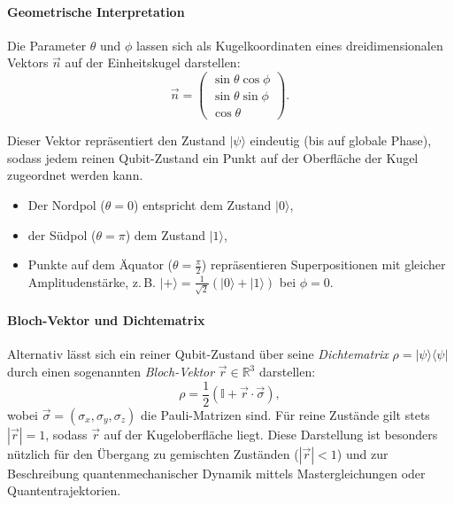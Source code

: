 \vspace{0.5em}
\paragraph{Geometrische Interpretation}

Die Parameter $\theta$ und $\phi$ lassen sich als Kugelkoordinaten eines dreidimensionalen Vektors $\vec{n}$ auf der Einheitskugel darstellen:
\begin{equation}
\vec{n} = 
\begin{pmatrix}
\sin\theta \cos\phi \\
\sin\theta \sin\phi \\
\cos\theta
\end{pmatrix}.
\end{equation}

Dieser Vektor repräsentiert den Zustand $|\psi\rangle$ eindeutig (bis auf globale Phase), sodass jedem reinen Qubit-Zustand ein Punkt auf der Oberfläche der Kugel zugeordnet werden kann.

\begin{itemize}
    \item Der Nordpol ($\theta = 0$) entspricht dem Zustand $|0\rangle$,
    \item der Südpol ($\theta = \pi$) dem Zustand $|1\rangle$,
    \item Punkte auf dem Äquator ($\theta = \frac{\pi}{2}$) repräsentieren Superpositionen mit gleicher Amplitudenstärke, z. B. $|+\rangle = \frac{1}{\sqrt{2}}(|0\rangle + |1\rangle)$ bei $\phi = 0$.
\end{itemize}

\vspace{0.5em}
\paragraph{Bloch-Vektor und Dichtematrix}

Alternativ lässt sich ein reiner Qubit-Zustand über seine \emph{Dichtematrix} $\rho = |\psi\rangle\langle\psi|$ durch einen sogenannten \emph{Bloch-Vektor} $\vec{r} \in \mathbb{R}^3$ darstellen:
\begin{equation}
\rho = \frac{1}{2} \left( \mathbb{I} + \vec{r} \cdot \vec{\sigma} \right),
\end{equation}
wobei $\vec{\sigma} = (\sigma_x, \sigma_y, \sigma_z)$ die Pauli-Matrizen sind. Für reine Zustände gilt stets $|\vec{r}| = 1$, sodass $\vec{r}$ auf der Kugeloberfläche liegt. Diese Darstellung ist besonders nützlich für den Übergang zu gemischten Zuständen ($|\vec{r}| < 1$) und zur Beschreibung quantenmechanischer Dynamik mittels Mastergleichungen oder Quantentrajektorien.

